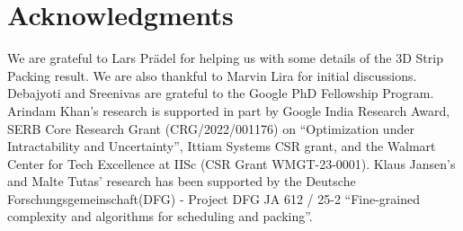 \documentclass[10pt,a4paper]{amsart}
\theoremstyle{definition}
\begin{document}

%
\section{Acknowledgments}
We are grateful to Lars Pr\"{a}del for helping us with some details of the 3D Strip Packing result.
We are also thankful to Marvin Lira for initial discussions.
Debajyoti and Sreenivas are grateful to the Google PhD Fellowship Program. Arindam Khan's research is supported in part by Google India Research Award, SERB Core Research Grant
(CRG/2022/001176) on \textquotedblleft{}Optimization under Intractability and Uncertainty\textquotedblright{}, Ittiam Systems CSR grant, and the Walmart
Center for Tech Excellence at IISc (CSR Grant WMGT-23-0001). 
Klaus Jansen's and Malte Tutas' research has been supported by the Deutsche Forschungsgemeinschaft(DFG) - Project DFG JA 612 / 25-2 ``Fine-grained complexity and algorithms for scheduling and packing''.
\end{document}
